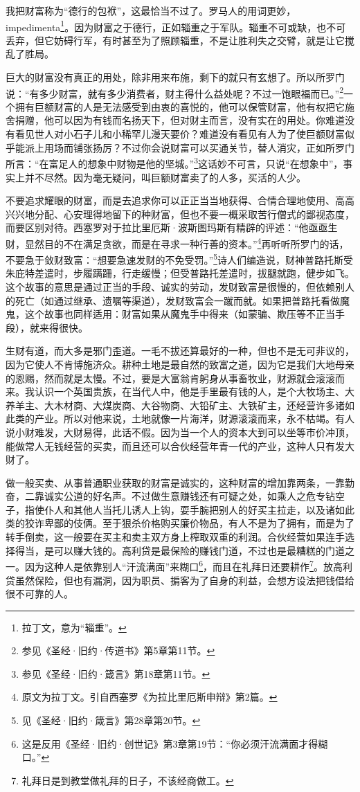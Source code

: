 \par 我把财富称为“德行的包袱”，这最恰当不过了。罗马人的用词更妙，impedimenta\footnote{拉丁文，意为“辎重”。}。因为财富之于德行，正如辎重之于军队。辎重不可或缺，也不可丢弃，但它妨碍行军，有时甚至为了照顾辎重，不是让胜利失之交臂，就是让它搅乱了胜局。
\par 巨大的财富没有真正的用处，除非用来布施，剩下的就只有玄想了。所以所罗门说：“有多少财富，就有多少消费者，财主得什么益处呢？不过一饱眼福而已。”\footnote{参见《圣经·旧约·传道书》第5章第11节。}一个拥有巨额财富的人是无法感受到由衷的喜悦的，他可以保管财富，他有权把它施舍捐赠，他可以因为有钱而名扬天下，但对财主而言，没有实在的用处。你难道没有看见世人对小石子儿和小稀罕儿漫天要价？难道没有看见有人为了使巨额财富似乎能派上用场而铺张扬厉？不过你会说财富可以买通关节，替人消灾，正如所罗门所言：“在富足人的想象中财物是他的坚城。”\footnote{参见《圣经·旧约·箴言》第18章第11节。}这话妙不可言，只说“在想象中”，事实上并不尽然。因为毫无疑问，叫巨额财富卖了的人多，买活的人少。
\par 不要追求耀眼的财富，而是去追求你可以正正当当地获得、合情合理地使用、高高兴兴地分配、心安理得地留下的种财富，但也不要一概采取苦行僧式的鄙视态度，而要区别对待。西塞罗对于拉比里厄斯·波斯图玛斯有精辟的评述：“他亟亟生财，显然目的不在满足贪欲，而是在寻求一种行善的资本。”\footnote{原文为拉丁文。引自西塞罗《为拉比里厄斯申辩》第2篇。}再听听所罗门的话，不要急于敛财致富：“想要急速发财的不免受罚。”\footnote{见《圣经·旧约·箴言》第28章第20节。}诗人们编造说，财神普路托斯受朱庇特差遣时，步履蹒跚，行走缓慢；但受普路托差遣时，拔腿就跑，健步如飞。这个故事的意思是通过正当的手段、诚实的劳动，发财致富是很慢的，但依赖别人的死亡（如通过继承、遗嘱等渠道），发财致富会一蹴而就。如果把普路托看做魔鬼，这个故事也同样适用：财富如果从魔鬼手中得来（如蒙骗、欺压等不正当手段），就来得很快。
\par 生财有道，而大多是邪门歪道。一毛不拔还算最好的一种，但也不是无可非议的，因为它使人不肯博施济众。耕种土地是最自然的致富之道，因为它是我们大地母亲的恩赐，然而就是太慢。不过，要是大富翁肯躬身从事畜牧业，财源就会滚滚而来。我认识一个英国贵族，在当代人中，他是手里最有钱的人，是个大牧场主、大养羊主、大木材商、大煤炭商、大谷物商、大铅矿主、大铁矿主，还经营许多诸如此类的产业。所以对他来说，土地就像一片海洋，财源滚滚而来，永不枯竭。有人说小财难发，大财易得，此话不假。因为当一个人的资本大到可以坐等市价冲顶，能做常人无钱经营的买卖，而且还可以合伙经营年青一代的产业，这种人只有发大财了。
\par 做一般买卖、从事普通职业获取的财富是诚实的，这种财富的增加靠两条，一靠勤奋，二靠诚实公道的好名声。不过做生意赚钱还有可疑之处，如乘人之危专钻空子，指使仆人和其他人当托儿诱人上钩，耍手腕把别人的好买主拉走，以及诸如此类的狡诈卑鄙的伎俩。至于狠杀价格购买廉价物品，有人不是为了拥有，而是为了转手倒卖，这一般要在买主和卖主双方身上榨取双重的利润。合伙经营如果连手选择得当，是可以赚大钱的。高利贷是最保险的赚钱门道，不过也是最糟糕的门道之一。因为这种人是依靠别人“汗流满面”来糊口\footnote{这是反用《圣经·旧约·创世记》第3章第19节：“你必须汗流满面才得糊口。”}，而且在礼拜日还要耕作\footnote{礼拜日是到教堂做礼拜的日子，不该经商做工。}。放高利贷虽然保险，但也有漏洞，因为职员、掮客为了自身的利益，会想方设法把钱借给很不可靠的人。
